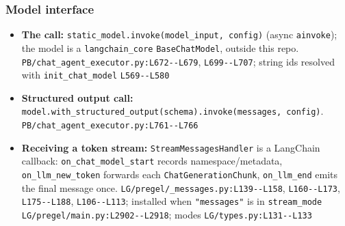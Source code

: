 \subsubsection*{Model interface}
\begin{itemize}
\item \textbf{The call:} \texttt{static\_\allowbreak{}model.\allowbreak{}invoke(\allowbreak{}model\_\allowbreak{}input, config)} (async \texttt{ainvoke}); the model is a \texttt{langchain\_\allowbreak{}core} \texttt{BaseChatModel}, outside this repo. \texttt{PB/\allowbreak{}chat\_\allowbreak{}agent\_\allowbreak{}executor.\allowbreak{}py:\allowbreak{}L672-\allowbreak{}-\allowbreak{}L679}, \texttt{L699-\allowbreak{}-\allowbreak{}L707}; string ids resolved with \texttt{init\_\allowbreak{}chat\_\allowbreak{}model} \texttt{L569-\allowbreak{}-\allowbreak{}L580}
\item \textbf{Structured output call:} \texttt{model.\allowbreak{}with\_\allowbreak{}structured\_\allowbreak{}output(\allowbreak{}schema).\allowbreak{}invoke(\allowbreak{}messages, config)}. \texttt{PB/\allowbreak{}chat\_\allowbreak{}agent\_\allowbreak{}executor.\allowbreak{}py:\allowbreak{}L761-\allowbreak{}-\allowbreak{}L766}
\item \textbf{Receiving a token stream:} \texttt{StreamMessagesHandler} is a LangChain callback: \texttt{on\_\allowbreak{}chat\_\allowbreak{}model\_\allowbreak{}start} records namespace/metadata, \texttt{on\_\allowbreak{}llm\_\allowbreak{}new\_\allowbreak{}token} forwards each \texttt{ChatGenerationChunk}, \texttt{on\_\allowbreak{}llm\_\allowbreak{}end} emits the final message once. \texttt{LG/\allowbreak{}pregel/\allowbreak{}\_\allowbreak{}messages.\allowbreak{}py:\allowbreak{}L139-\allowbreak{}-\allowbreak{}L158}, \texttt{L160-\allowbreak{}-\allowbreak{}L173}, \texttt{L175-\allowbreak{}-\allowbreak{}L188}, \texttt{L106-\allowbreak{}-\allowbreak{}L113}; installed when \texttt{"messages"} is in \texttt{stream\_\allowbreak{}mode} \texttt{LG/\allowbreak{}pregel/\allowbreak{}main.\allowbreak{}py:\allowbreak{}L2902-\allowbreak{}-\allowbreak{}L2918}; modes \texttt{LG/\allowbreak{}types.\allowbreak{}py:\allowbreak{}L131-\allowbreak{}-\allowbreak{}L133}

\end{itemize}
